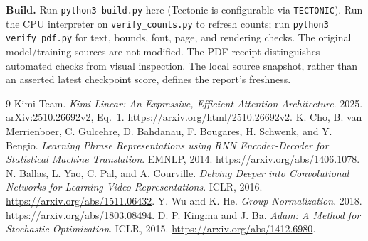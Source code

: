 \documentclass[10pt,letterpaper]{article}
\begin{document}
\textbf{Build.} Run \texttt{python3 build.py} here (Tectonic is configurable via \texttt{TECTONIC}). Run the CPU interpreter on \texttt{verify\_counts.py} to refresh counts; run \texttt{python3 verify\_pdf.py} for text, bounds, font, page, and rendering checks. The original model/training sources are not modified. The PDF receipt distinguishes automated checks from visual inspection. The local source snapshot, rather than an asserted latest checkpoint score, defines the report's freshness.

\vspace{-7pt}
\begin{thebibliography}{9}\setlength{\itemsep}{1pt}
 Kimi Team. \emph{Kimi Linear: An Expressive, Efficient Attention Architecture}. 2025. arXiv:2510.26692v2, Eq.~1. \url{https://arxiv.org/html/2510.26692v2}.
 K. Cho, B. van Merrienboer, C. Gulcehre, D. Bahdanau, F. Bougares, H. Schwenk, and Y. Bengio. \emph{Learning Phrase Representations using RNN Encoder-Decoder for Statistical Machine Translation}. EMNLP, 2014. \url{https://arxiv.org/abs/1406.1078}.
 N. Ballas, L. Yao, C. Pal, and A. Courville. \emph{Delving Deeper into Convolutional Networks for Learning Video Representations}. ICLR, 2016. \url{https://arxiv.org/abs/1511.06432}.
 Y. Wu and K. He. \emph{Group Normalization}. 2018. \url{https://arxiv.org/abs/1803.08494}.
 D. P. Kingma and J. Ba. \emph{Adam: A Method for Stochastic Optimization}. ICLR, 2015. \url{https://arxiv.org/abs/1412.6980}.
\end{thebibliography}
\end{document}
